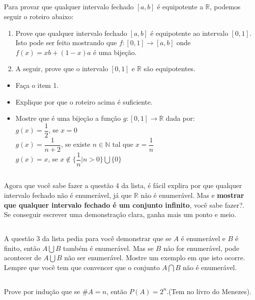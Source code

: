 \documentclass[]{article}
\begin{document}
		\subsection{}Para provar que qualquer intervalo fechado $[a,b]$ é equipotente a $\mathbb{R}$, podemos seguir o roteiro abaixo:
		\begin{enumerate}
			\item Prove que qualquer intervalo fechado $[a,b]$ é equipotente ao intervalo $[0,1]$. Isto pode ser feito mostrando que $f:[0,1] \to [a,b]$ onde $f(x) = xb+(1-x)a$ é uma bijeção.
			\item A seguir, prove que o intervalo $[0,1]$ e $\mathbb{R}$ são equipotentes.
		\end{enumerate}
		\begin{itemize}
			\item Faça o item 1.
			\item Explique por que o roteiro acima é suficiente.
			\item Mostre que é uma bijeção a função $g: [0,1]\to \mathbb{R}$ dada por:\\
			$g(x) = \dfrac{1}{2}$, se $x=0$\\
			$g(x) = \dfrac{1}{n+2}$, se existe $n \in \mathbb{N}$ tal que $x = \dfrac{1}{n}$\\
	$g(x) = x$, se $x \notin \{\dfrac{1}{n}|n>0\} \bigcup \{0\}$
		\end{itemize}
		\subsection{} Agora que você sabe fazer a questão 4 da lista, é fácil explira por que qualquer intervalo fechado não é enumerável, já que $\mathbb{R}$ não é enumerável. Mas e \textbf{mostrar que qualquer intervalo fechado é um conjunto infinito}, você sabe fazer?. Se conseguir escrever uma demonstração clara, ganha mais um ponto e meio.
		\subsection{} A questão 3 da lista pedia para você demonstrar que se $A$ é enumerável e $B$ é finito, então $A \bigcup B$ também é enumerável. Mas se $B$ não for enumerável, pode acontecer de $A \bigcup B$ não ser enumerável. Mostre um exemplo em que isto ocorre. Lempre que você tem que convencer que o conjunto $A \bigcap B$ não é enumerável.
		\subsection{}Prove por indução que se $\#A = n$, então $P(A) =2^n$.(Tem no livro do Menezes).
		\newpage
\end{document}
